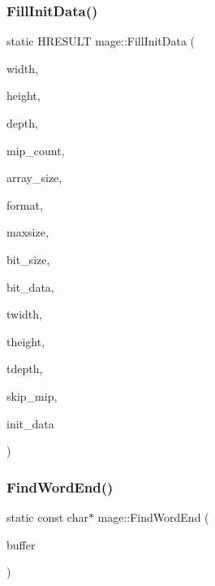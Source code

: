 \subsubsection{\texorpdfstring{Fill\+Init\+Data()}{FillInitData()}}
{\footnotesize\ttfamily static H\+R\+E\+S\+U\+LT mage\+::\+Fill\+Init\+Data (\begin{DoxyParamCaption}\item[{\+\_\+\+In\+\_\+ size\+\_\+t}]{width,  }\item[{\+\_\+\+In\+\_\+ size\+\_\+t}]{height,  }\item[{\+\_\+\+In\+\_\+ size\+\_\+t}]{depth,  }\item[{\+\_\+\+In\+\_\+ size\+\_\+t}]{mip\+\_\+count,  }\item[{\+\_\+\+In\+\_\+ size\+\_\+t}]{array\+\_\+size,  }\item[{\+\_\+\+In\+\_\+ D\+X\+G\+I\+\_\+\+F\+O\+R\+M\+AT}]{format,  }\item[{\+\_\+\+In\+\_\+ size\+\_\+t}]{maxsize,  }\item[{\+\_\+\+In\+\_\+ size\+\_\+t}]{bit\+\_\+size,  }\item[{\+\_\+\+In\+\_\+reads\+\_\+bytes\+\_\+(bit\+\_\+size) const uint8\+\_\+t $\ast$}]{bit\+\_\+data,  }\item[{\+\_\+\+Out\+\_\+ size\+\_\+t \&}]{twidth,  }\item[{\+\_\+\+Out\+\_\+ size\+\_\+t \&}]{theight,  }\item[{\+\_\+\+Out\+\_\+ size\+\_\+t \&}]{tdepth,  }\item[{\+\_\+\+Out\+\_\+ size\+\_\+t \&}]{skip\+\_\+mip,  }\item[{\+\_\+\+Out\+\_\+writes\+\_\+(mip\+\_\+count $\ast$array\+\_\+size) D3\+D11\+\_\+\+S\+U\+B\+R\+E\+S\+O\+U\+R\+C\+E\+\_\+\+D\+A\+TA $\ast$}]{init\+\_\+data }\end{DoxyParamCaption})\hspace{0.3cm}{\ttfamily [static]}}

\hypertarget{namespacemage_a81ebde51f9da00dd6fad364a2c5017cb}{}\label{namespacemage_a81ebde51f9da00dd6fad364a2c5017cb} 
\subsubsection{\texorpdfstring{Find\+Word\+End()}{FindWordEnd()}}
{\footnotesize\ttfamily static const char$\ast$ mage\+::\+Find\+Word\+End (\begin{DoxyParamCaption}\item[{const char $\ast$}]{buffer }\end{DoxyParamCaption})\hspace{0.3cm}{\ttfamily [static]}}


